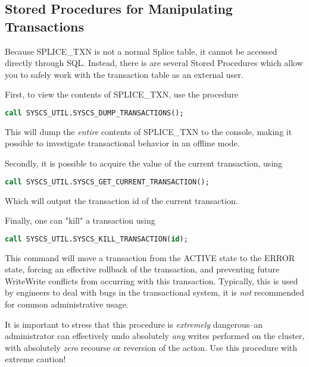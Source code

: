 \subsection{Stored Procedures for Manipulating Transactions}
Because SPLICE\_TXN is not a normal Splice table, it cannot be accessed directly through SQL. Instead, there is are several Stored Procedures which allow you to safely work with the transaction table as an external user.

First, to view the contents of SPLICE\_TXN, use the procedure

\begin{lstlisting}[frame=single,captionpos=b,language=SQL,caption=Procedure to Dump Transaction Table]
call SYSCS_UTIL.SYSCS_DUMP_TRANSACTIONS();
\end{lstlisting}

This will dump the \emph{entire} contents of SPLICE\_TXN to the console, making it possible to investigate transactional behavior in an offline mode.

Secondly, it is possible to acquire the value of the current transaction, using

\begin{lstlisting}[frame=single,captionpos=b,language=SQL,caption=Procedure to Dump Transaction Table]
call SYSCS_UTIL.SYSCS_GET_CURRENT_TRANSACTION();
\end{lstlisting}

Which will output the transaction id of the current transaction. 

Finally, one can "kill" a transaction using
\begin{lstlisting}[frame=single,captionpos=b,language=SQL,caption=Procedure to Dump Transaction Table]
call SYSCS_UTIL.SYSCS_KILL_TRANSACTION(id);
\end{lstlisting}

This command will move a transaction from the ACTIVE state to the ERROR state, forcing an effective rollback of the transaction, and preventing future WriteWrite conflicts from occurring with this transaction. Typically, this is used by engineers to deal with bugs in the transactional system, it is \emph{not} recommended for common administrative usage.

It is important to stress that this procedure is \emph{extremely} dangerous--an administrator can effectively undo absolutely \emph{any} writes performed on the cluster, with absolutely \emph{zero} recourse or reversion of the action. Use this procedure with extreme caution!

